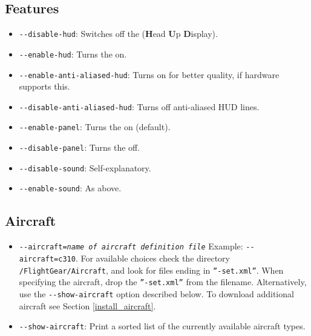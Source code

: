 \subsection{Features}
\begin{itemize}
\item{\texttt{-$ $-disable-hud}}: Switches off the  (\textbf{H}ead \textbf{U}p
  \textbf{D}isplay).
\item{\texttt{-$ $-enable-hud}}: Turns the   on.
\item{\texttt{-$ $-enable-anti-aliased-hud}}: Turns on  for better quality,
if hardware supports this.
\item{\texttt{-$ $-disable-anti-aliased-hud}}: Turns off anti-aliased HUD lines.
\item{\texttt{-$ $-enable-panel}}: Turns the  on (default).
\item{\texttt{-$ $-disable-panel}}: Turns the  off.
\item{\texttt{-$ $-disable-sound}}: Self-explanatory.
\item{\texttt{-$ $-enable-sound}}: As above.
\end{itemize}

\subsection{Aircraft}

\begin{itemize}
\item{\texttt{-$ $-aircraft={\it name of aircraft definition file}}} Example: \texttt{-$ $-aircraft=c310}. For available choices check the directory \texttt{/FlightGear/Aircraft}, and look for files ending in \texttt{''-set.xml''}. When specifying the aircraft, drop the \texttt{''-set.xml''} from the filename. Alternatively, use the \texttt{-$ $-show-aircraft} option described below. To download additional aircraft see Section \ref{install_aircraft}.

\item{\texttt{-$ $-show-aircraft}}: Print a sorted list of the currently available aircraft types.
\end{itemize}

